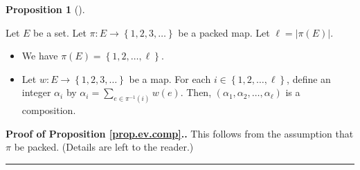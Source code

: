 \documentclass[numbers=enddot,12pt,final,onecolumn,notitlepage,abstracton]{scrartcl}
\theoremstyle{definition}
\newtheorem{prop}[theo]{Proposition}
\newenvironment{proposition}[1][]
{\begin{prop}[#1]\begin{leftbar}}
{\end{leftbar}\end{prop}}
\newenvironment{proof}[1][Proof]{\noindent\textbf{#1.} }{\ \rule{0.5em}{0.5em}}
\let\sumnonlimits\sum
\renewcommand{\sum}{\sumnonlimits\limits}
\newenvironment{vershort}{}{}
\begin{document}
\begin{proposition}
\label{prop.ev.comp}
Let $E$ be a set.
Let $\pi : E \to \left\{1, 2, 3, \ldots\right\}$ be a packed map.
Let $\ell = \left|\pi\left(E\right)\right|$.

\begin{itemize}
\item[(a)] We have $\pi\left(E\right) = \left\{1, 2, \ldots, \ell\right\}$.

\item[(b)] Let $w : E \to \left\{1, 2, 3, \ldots\right\}$ be a
map. For each $i \in \left\{1, 2, \ldots, \ell\right\}$, define an
integer $\alpha_i$ by $\alpha_i = \sum_{e \in \pi^{-1}\left(i\right)}
w\left(e\right)$. Then,
$\left(\alpha_1, \alpha_2, \ldots, \alpha_\ell\right)$ is a
composition.
\end{itemize}
\end{proposition}

\begin{vershort}
\begin{proof}[Proof of Proposition \ref{prop.ev.comp}.]
This follows from the assumption that $\pi$ be packed. (Details
are left to the reader.)
\end{proof}
\end{vershort}
\end{document}
